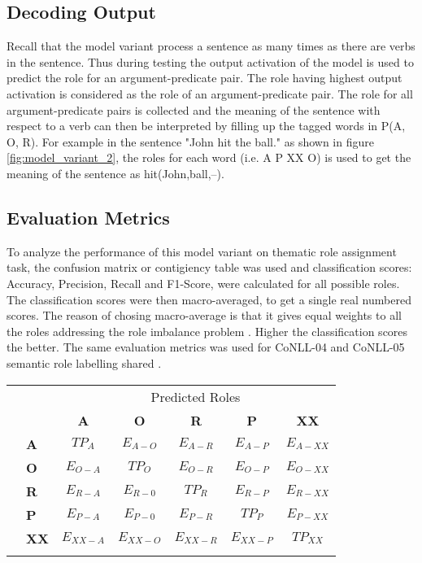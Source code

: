 \subsection{Decoding Output}

Recall that the model variant process a sentence as many times as there are verbs in the sentence. Thus during testing the output activation of the model is used to predict the role for an argument-predicate pair. The role having highest output activation is considered as the role of an argument-predicate pair. The role for all argument-predicate pairs is collected and the meaning of the sentence with respect to a verb can then be interpreted by filling up the tagged words in P(A, O, R). For example in the sentence "John hit the ball." as shown in figure \ref{fig:model_variant_2}, the roles for each word (i.e. A P XX O) is used to get the meaning of the sentence as hit(John,ball,--).

\subsection{Evaluation Metrics}\label{sec:evaluation_metrics_2}

To analyze the performance of this model variant on thematic role assignment task, the confusion matrix or contigiency table \cite{confusion_martrix:1998} was used and classification scores: Accuracy, Precision, Recall and F1-Score, were calculated for all possible roles. The classification scores were then macro-averaged, to get a single real numbered scores. The reason of chosing macro-average is that it gives equal weights to all the roles addressing the role imbalance problem \cite{macro_average:2005}. Higher the classification scores the better. The same evaluation metrics was used for CoNLL-04 and CoNLL-05 semantic role labelling shared \cite{conll:2004,conll:2005}.

\begin{tabular}{l|l|c|c|c|c|c|}
\multicolumn{2}{c}{}  &\multicolumn{5}{c}{Predicted Roles}\\
\cline{3-7}
\multicolumn{2}{c|}{} & \textbf{A} & \textbf{O} & \textbf{R} & \textbf{P} & \textbf{XX}\\
\hhline{|~|*6-|}
\multirow{5}{*}{True Roles}
& \textbf{A} 	& \cellcolor{gray!25}$TP_{A}$ & $E_{A-O}$ & $E_{A-R}$ & $E_{A-P}$ & $E_{A-XX}$ \\
\hhline{~|*6-}
& \textbf{O} 	& $E_{O-A}$ &\cellcolor{gray!25} $TP_{O}$ & $E_{O-R}$ & $E_{O-P}$ & $E_{O-XX}$ \\
\hhline{~|*6-}
& \textbf{R} 	& $E_{R-A}$ & $E_{R-0}$ & \cellcolor{gray!25}$TP_{R}$ & $E_{R-P}$ & $E_{R-XX}$ \\
\hhline{~|*6-}
& \textbf{P} 	& $E_{P-A}$ & $E_{P-0}$ & $E_{P-R}$ & \cellcolor{gray!25}$TP_{P}$ & $E_{P-XX}$ \\
\hhline{~|*6-}
& \textbf{XX} 	& $E_{XX-A}$ & $E_{XX-O}$ & $E_{XX-R}$ & $E_{XX-P}$ & \cellcolor{gray!25}$TP_{XX}$ \\
\hhline{~|*6-}
\end{tabular}\\


